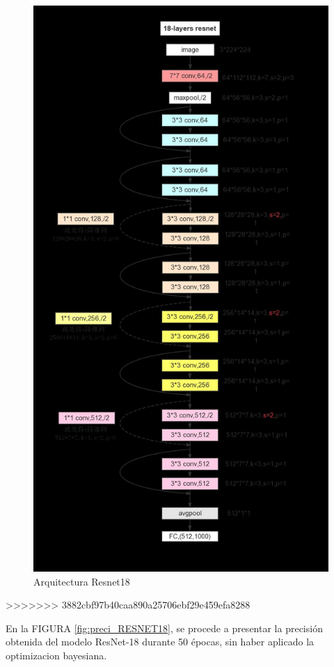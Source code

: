 				\begin{figure}[ht]
					\centering
					\includegraphics[scale=0.09]{Figs/69.png}
					\caption{Arquitectura Resnet18}
					\label{fig:RESNET18}
				\end{figure}
>>>>>>> 3882cbf97b40caa890a25706ebf29e459efa8288

		\newpage	
		En la FIGURA \ref{fig:preci_RESNET18}, se procede a presentar la precisión obtenida del modelo ResNet-18 durante 50 épocas, sin haber aplicado la optimizacion bayesiana.
		
